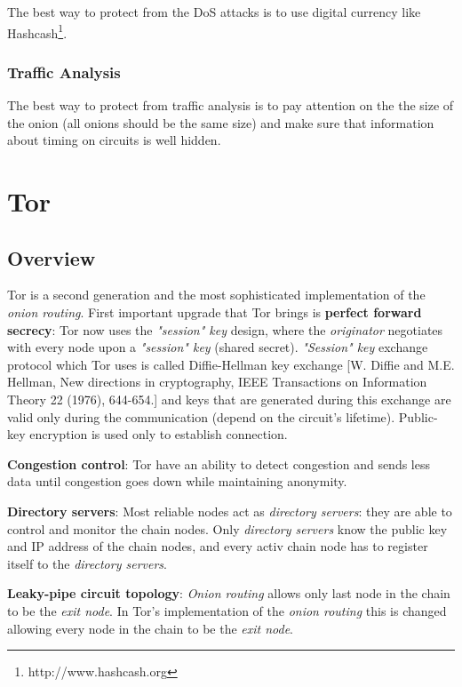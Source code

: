 \documentclass{acm_proc_article-sp}
\begin{document}
The best way to protect from the DoS attacks is to use digital currency like Hashcash\footnote{http://www.hashcash.org}. 

\subsubsection{Traffic Analysis}

The best way to protect from traffic analysis is to pay attention on the the size of the onion (all onions should be the same size) and make sure that information about timing on circuits is well hidden. \cite{cite4}

\section{Tor}
\subsection{Overview}

Tor is a second generation and the most sophisticated implementation of the \textit{onion routing}. First important upgrade that Tor brings is \textbf{perfect forward secrecy}: Tor now uses the \textit{"session" key} design, where the \textit{originator} negotiates with every node upon a \textit{"session" key} (shared secret). \textit{"Session" key} exchange protocol which Tor uses is called Diffie-Hellman key exchange [W. Diffie and M.E. Hellman, New directions in cryptography, IEEE Transactions on Information Theory 22 (1976), 644-654.] and keys that are generated during this exchange are valid only during the communication (depend on the circuit's lifetime). Public-key encryption is used only to establish connection. \cite{cite4} \cite{cite6}

\textbf{Congestion control}: Tor have an ability to detect congestion and sends less data until congestion goes down while maintaining anonymity. \cite{cite6}

\textbf{Directory servers}: Most reliable nodes act as \textit{directory servers}: they are able to control and monitor the chain nodes. Only \textit{directory servers} know the public key and IP address of the chain nodes, and every activ chain node has to register itself to the \textit{directory servers}. \cite{cite6}

\textbf{Leaky-pipe circuit topology}: \textit{Onion routing} allows only last node in the chain to be the \textit{exit node}. In Tor's implementation of the \textit{onion routing} this is changed allowing every node in the chain to be the \textit{exit node}. \cite{cite4}
\end{document}
